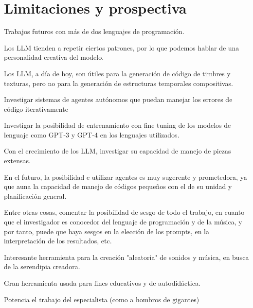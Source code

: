 \chapter{Limitaciones y prospectiva}


Trabajos futuros con más de dos lenguajes de programación.

Los LLM tienden a repetir ciertos patrones, por lo que podemos hablar de una personalidad creativa del modelo.

Los LLM, a día de hoy, son útiles para la generación de código de timbres y texturas, pero no para la generación de estructuras temporales compositivas.

Investigar sistemas de agentes autónomos que puedan manejar los errores de código iterativamente

Investigar la posibilidad de entrenamiento con fine tuning de los modelos de lenguaje como GPT-3 y GPT-4 en los lenguajes utilizados.

Con el crecimiento de los LLM, investigar su capacidad de manejo de piezas extensas.

En el futuro, la posibilidad e utilizar agentes es muy sugerente y prometedora, ya que auna la capacidad de manejo de códigos pequeños con el de su unidad y planificación general.

Entre otras cosas, comentar la posibilidad de sesgo de todo el trabajo, en cuanto que el investigador es conocedor del lenguaje de programación y de la música, y por tanto, puede que haya sesgos en la elección de los prompts, en la interpretación de los resultados, etc.

Interesante herramienta para la creación "aleatoria" de sonidos y música, en busca de la serendipia creadora.

Gran herramienta usada para fines educativos y de autodidáctica.

Potencia el trabajo del especialista (como a hombros de gigantes)

